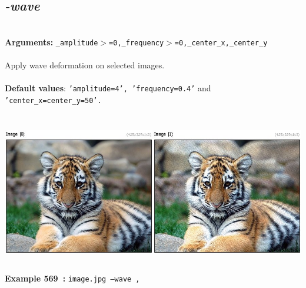 \documentclass[a4paper,11pt,twoside]{book}
\begin{document}
\subsection{\emph{-wave} }\vspace*{-0.5em}
~\\\textbf{Arguments: } 
{\small \texttt{\_amplitude$>$=0,\_frequency$>$=0,\_center\_x,\_center\_y}}\\~\\
Apply wave deformation on selected images.
~\\~\\\textbf{Default values}: {\small \texttt{'amplitude=4', 'frequency=0.4'} and \texttt{'center\_x=center\_y=50'.}}
\begin{center}\includegraphics[keepaspectratio=true,height=7cm,width=\textwidth]{img/gmic_def569.jpg}\\
{\footnotesize \textbf{Example 569~:} \texttt{image.jpg --wave ,}}
\end{center}
\end{document}
